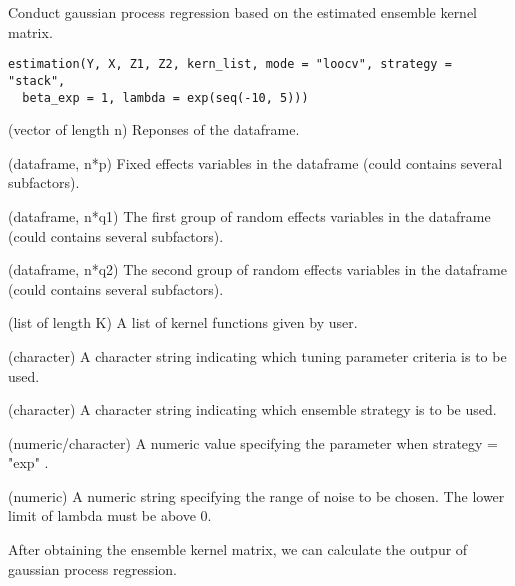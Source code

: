 \documentclass[a4paper]{book}
\begin{document}
%
\begin{Description}\relax
Conduct gaussian process regression based on the estimated ensemble kernel
matrix.
\end{Description}
%
\begin{Usage}
\begin{verbatim}
estimation(Y, X, Z1, Z2, kern_list, mode = "loocv", strategy = "stack",
  beta_exp = 1, lambda = exp(seq(-10, 5)))
\end{verbatim}
\end{Usage}
%
\begin{Arguments}
\begin{ldescription}
\item[\code{Y}] (vector of length n) Reponses of the dataframe.

\item[\code{X}] (dataframe, n*p) Fixed effects variables in the dataframe (could
contains several subfactors).

\item[\code{Z1}] (dataframe, n*q1) The first group of random effects variables in
the dataframe (could contains several subfactors).

\item[\code{Z2}] (dataframe, n*q2) The second group of random effects variables in
the dataframe (could contains several subfactors).

\item[\code{kern\_list}] (list of length K) A list of kernel functions given by
user.

\item[\code{mode}] (character) A character string indicating which tuning parameter
criteria is to be used.

\item[\code{strategy}] (character) A character string indicating which ensemble
strategy is to be used.

\item[\code{beta\_exp}] (numeric/character) A numeric value specifying the parameter
when strategy = "exp" .

\item[\code{lambda}] (numeric) A numeric string specifying the range of noise to be
chosen. The lower limit of lambda must be above 0.
\end{ldescription}
\end{Arguments}
%
\begin{Details}\relax
After obtaining the ensemble kernel matrix, we can calculate the outpur of
gaussian process regression.
\end{Details}
\end{document}
